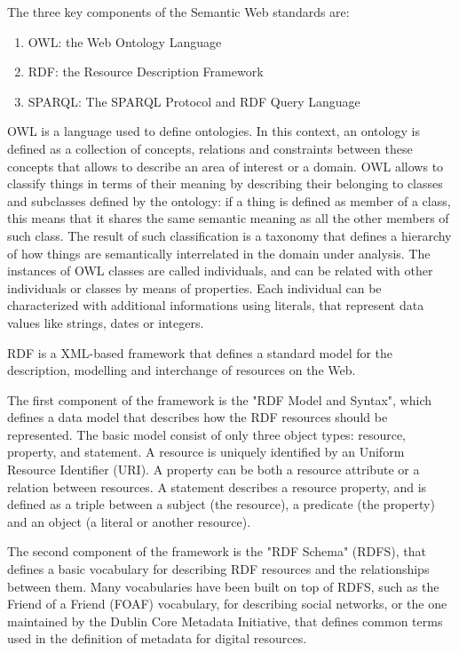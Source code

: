 \documentclass[%
    corpo=13.5pt,
    twoside,
    oldstyle,
    tipotesi=magistrale,
    greek,
    evenboxes
]{toptesi}
\begin{document}
The three key components of the Semantic Web standards are:
\begin{enumerate}
\item OWL: the Web Ontology Language
\item RDF: the Resource Description Framework
\item SPARQL: The SPARQL Protocol and RDF Query Language
\end{enumerate}
\bigskip

OWL is a language used to define ontologies. In this context, an ontology
is defined as a collection of concepts, relations and constraints between
these concepts that allows to describe an area of interest or a domain.
OWL allows to classify things in terms of their meaning by describing
their belonging to classes and subclasses defined by the ontology: if
a thing is defined as member of a class, this means that it shares the
same semantic meaning as all the other members of such class. The result of
such classification is a taxonomy that defines a hierarchy of how things
are semantically interrelated in the domain under analysis.
The instances of OWL classes are called individuals, and can be related
with other individuals or classes by means of properties. Each individual
can be characterized with additional informations using literals, that
represent data values like strings, dates or integers.
\newline

RDF is a XML-based framework that defines a standard model for the
description, modelling and interchange of resources on the Web.

The first component of the framework is the "RDF Model and Syntax",
which defines a data model that describes how the RDF resources should be
represented. The basic model consist of only three object types: resource,
property, and statement.
A resource is uniquely identified by an Uniform Resource Identifier (URI).
A property can be both a resource attribute or a relation between resources.
A statement describes a resource property, and is defined as a triple
between a subject (the resource), a predicate (the property) and an
object (a literal or another resource).

The second component of the framework is the "RDF Schema" (RDFS),
that defines a basic vocabulary for describing RDF resources and the
relationships between them. Many vocabularies have been built on top of
RDFS, such as the Friend of a Friend (FOAF) vocabulary, for describing
social networks, or the one maintained by the Dublin Core Metadata
Initiative, that defines common terms used in the definition of metadata
for digital resources.
\end{document}
